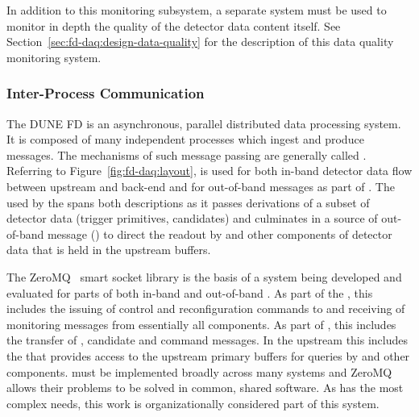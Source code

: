 In addition to this   monitoring subsystem, a separate system must be used to monitor in depth the quality of the detector data content itself. 
See Section~\ref{sec:fd-daq:design-data-quality} for the description of this data quality monitoring system.

\subsubsection{Inter-Process Communication}
\label{sec:daq:design-ipc}

The DUNE FD  is an asynchronous, parallel distributed data processing system. 
It is composed of many independent processes which ingest and produce messages. 
The mechanisms of such message passing are generally called . 
Referring to Figure~\ref{fig:fd-daq:layout},  is used for both in-band detector data flow between upstream  and back-end  and for out-of-band messages as part of .  The  used by the  spans both descriptions as it passes derivations of a subset of detector data (trigger primitives, candidates) and culminates in a source of out-of-band message () to direct the readout by  and other components of detector data that is held in the upstream  buffers.

The ZeroMQ~\cite{zeromq} smart socket library is 
the basis of a system being developed and evaluated for parts of both in-band and out-of-band . 
As part of the , this includes the issuing of control and reconfiguration commands to and receiving of monitoring messages from essentially all  components. 
As part of , this includes the transfer of , candidate and command messages. 
In the upstream  this includes the  that  provides access to the upstream  primary buffers for queries by  and other components. 
  must be implemented broadly across many  systems and ZeroMQ allows their problems to be solved in common, shared software.  As  has the most complex   needs, this work is organizationally considered part of this system.


